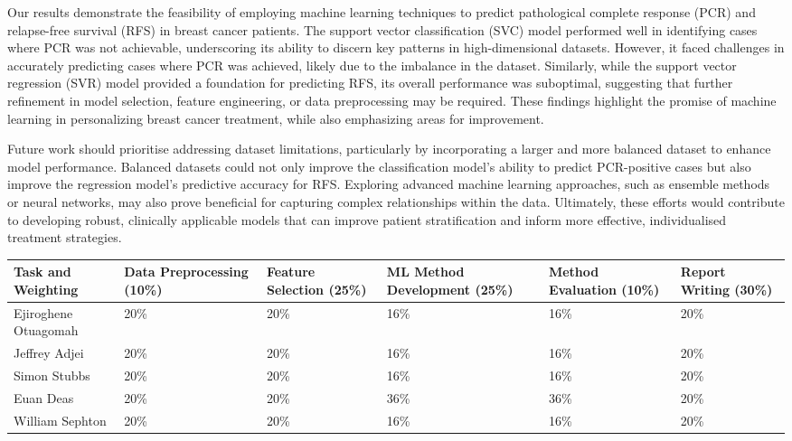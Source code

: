 \documentclass{article}
\begin{document}
Our results demonstrate the feasibility of employing machine learning techniques to predict pathological complete response (PCR) and relapse-free survival (RFS) in breast cancer patients. The support vector classification (SVC) model performed well in identifying cases where PCR was not achievable, underscoring its ability to discern key patterns in high-dimensional datasets. However, it faced challenges in accurately predicting cases where PCR was achieved, likely due to the imbalance in the dataset. Similarly, while the support vector regression (SVR) model provided a foundation for predicting RFS, its overall performance was suboptimal, suggesting that further refinement in model selection, feature engineering, or data preprocessing may be required. These findings highlight the promise of machine learning in personalizing breast cancer treatment, while also emphasizing areas for improvement.

Future work should prioritise addressing dataset limitations, particularly by incorporating a larger and more balanced dataset to enhance model performance. Balanced datasets could not only improve the classification model's ability to predict PCR-positive cases but also improve the regression model's predictive accuracy for RFS. Exploring advanced machine learning approaches, such as ensemble methods or neural networks, may also prove beneficial for capturing complex relationships within the data. Ultimately, these efforts would contribute to developing robust, clinically applicable models that can improve patient stratification and inform more effective, individualised treatment strategies.




\begin{table}[bp]
  \begin{tabular}{|p{2cm}|p{2.5cm}|p{2.5cm}|p{2.5cm}|p{2.5cm}|p{2.5cm}|}
  \hline
  \textbf{Task and Weighting} & \textbf{Data Preprocessing (10\%)} & \textbf{Feature Selection (25\%)} & \textbf{ML Method Development (25\%)} & \textbf{Method Evaluation (10\%)} & \textbf{Report Writing (30\%)} \\ \hline
  Ejiroghene Otuagomah & 20\% & 20\% & 16\% & 16\% & 20\% \\ \hline
  Jeffrey Adjei & 20\% & 20\% & 16\% & 16\% & 20\% \\ \hline
  Simon Stubbs & 20\% & 20\% & 16\% & 16\% & 20\% \\ \hline
  Euan Deas & 20\% & 20\% & 36\% & 36\% & 20\% \\ \hline
  William Sephton & 20\% & 20\% & 16\% & 16\% & 20\% \\ \hline
  \end{tabular}
  \end{table}
\end{document}
